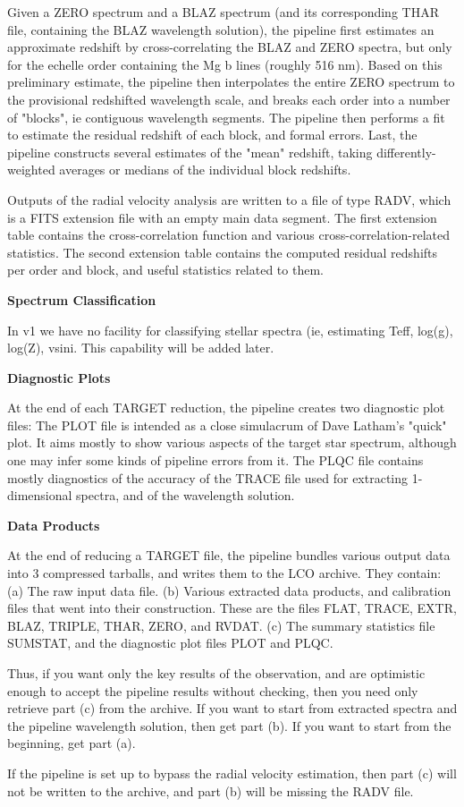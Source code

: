Given a ZERO spectrum and a BLAZ spectrum (and its corresponding THAR file,
containing the BLAZ wavelength solution), 
the pipeline first estimates an approximate redshift 
by cross-correlating the BLAZ and ZERO spectra, but only for the echelle order
containing the Mg b lines (roughly 516 nm).
Based on this preliminary estimate, the pipeline then interpolates the
entire ZERO spectrum to the provisional redshifted wavelength scale,
and breaks each order into a number of "blocks", ie contiguous wavelength
segments.
The pipeline then performs a fit to estimate 
the residual redshift of each block, and formal errors.
Last, the pipeline constructs several estimates of the "mean" redshift,
taking differently-weighted averages or medians of the individual block
redshifts.

Outputs of the radial velocity analysis are written to a file of type RADV,
which is a FITS extension file with an empty main data segment.
The first extension table contains
the cross-correlation function and various cross-correlation-related statistics.
The second extension table contains the computed residual redshifts per
order and block, and useful statistics related to them.
 
\vskip12pt
\parindent=0pt
{\bf{Spectrum Classification}}
\vskip8pt
\parindent20pt

In v1 we have no facility for classifying stellar spectra (ie, estimating
Teff, log(g), log(Z), vsini.  This capability will be added later.

\vskip12pt
\parindent=0pt
{\bf{Diagnostic Plots}}
\vskip8pt
\parindent20pt

At the end of each TARGET reduction, the pipeline creates two diagnostic
plot files:
The PLOT file is intended as a close simulacrum of Dave Latham's "quick"
plot.  
It aims mostly to show various aspects of the target star spectrum, although one
may infer some kinds of pipeline errors from it.
The PLQC file contains mostly diagnostics of the accuracy of the TRACE file used
for extracting 1-dimensional spectra, and of the wavelength solution.

\vskip12pt
\parindent=0pt
{\bf{Data Products}}
\vskip8pt
\parindent20pt


At the end of reducing a TARGET file, the pipeline bundles various output
data into 3 compressed tarballs, and writes them to the LCO archive.
They contain: (a) The raw input data file.  
(b) Various extracted data products, and calibration files that went into their
construction.  These are the files FLAT, TRACE, EXTR, BLAZ, TRIPLE, THAR,
ZERO, and RVDAT.  
(c) The summary statistics file SUMSTAT, and the diagnostic plot 
files PLOT and PLQC.

Thus, if you want only the key results of the observation, and are optimistic
enough to accept the pipeline results without checking, then you need only
retrieve part (c) from the archive.
If you want to start from extracted spectra and the pipeline wavelength
solution, then get part (b).
If you want to start from the beginning, get part (a).

If the pipeline is set up to bypass the radial velocity estimation, then
part (c) will not be written to the archive, and part (b) will be missing
the RADV file.

\bye
